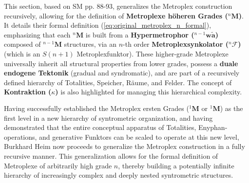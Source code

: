 \documentclass[12pt]{article}
\newcommand{\metroplex}[1]{{}^{#1}\mathbf{M}}
\newcommand{\hypersyntrix}{\metroplex{1}}
\newcommand{\hypermetrophor}[1]{{}^{#1}\mathbf{w\widetilde{a}}}
\newcommand{\metroplexsynkolator}[1]{{}^{#1}\mathcal{F}}
\begin{document}
This section, based on SM pp. 88-93, generalizes the Metroplex construction recursively, allowing for the definition of \textbf{Metroplexe höheren Grades (\(\metroplex{n}\))}. It details their formal definition (\eqref{eq:original_metroplex_n_formal}), emphasizing that each \(\metroplex{n}\) is built from a \textbf{Hypermetrophor (\(\hypermetrophor{n-1}\))} composed of \(\metroplex{n-1}\) structures, via an \(n\)-th order \textbf{Metroplexsynkolator (\(\metroplexsynkolator{n}\))} (which is an \(S(n+1)\) Metroplexfunktor). These higher-grade Metroplexe universally inherit all structural properties from lower grades, possess a \textbf{duale endogene Tektonik} (gradual and syndromatic), and are part of a recursively defined hierarchy of Totalities, Speicher, Räume, and Felder. The concept of \textbf{Kontraktion (\(\kappa\))} is also highlighted for managing this hierarchical complexity.

Having successfully established the Metroplex ersten Grades (\( \hypersyntrix \) or \( \metroplex{1} \)) as the first level in a new hierarchy of syntrometric organization, and having demonstrated that the entire conceptual apparatus of Totalities, Enyphan-operations, and generative Funktors can be scaled to operate at this new level, Burkhard Heim now proceeds to generalize the Metroplex construction in a fully recursive manner. This generalization allows for the formal definition of Metroplexe of arbitrarily high grade \( n \), thereby building a potentially infinite hierarchy of increasingly complex and deeply nested syntrometric structures.
\end{document}
